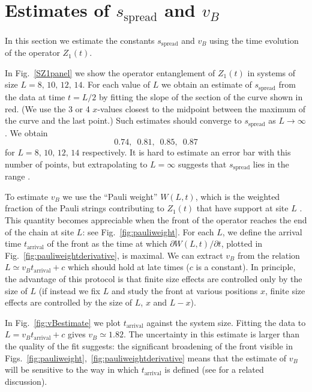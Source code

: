 \documentclass[aps,prx,twocolumn,superscriptaddress,floatfix,nofootinbib,prx]{revtex4}
\renewcommand{\>}{\right\rangle}
\newcommand{\<}{\left\langle}
\newcommand{\be}{\begin{equation}}
\newcommand{\ee}{\end{equation}}
\newcommand{\sspr}{s_\text{spread}}
\begin{document}
\section{Estimates of $\sspr$ and $v_B$}
\label{app:extrapolationsspr}



In this section we estimate the constants $\sspr$ and $v_B$ using the time evolution of the operator $Z_1(t)$. 

In Fig.~\ref{SZ1panel} we show the operator entanglement of $Z_1(t)$ in systems of size $L=8,\, 10, \, 12,\,14$. For each value of $L$ we obtain an estimate of $\sspr$ from the data at time $t=L/2$ by fitting the slope of the section of the curve shown in red. (We use the 3 or 4 $x$-values closest to the midpoint between the maximum of the curve and the last point.) Such estimates should converge to $\sspr$ as $L\rightarrow \infty$. We obtain
\be
0.74, \,\,\, 0.81, \,\,\, 0.85, \,\,\, 0.87 
\ee
for $L=8,\,10,\,12,\,14$ respectively. It is hard to estimate an error bar with this number of points, but extrapolating to ${L=\infty}$ suggests that $\sspr$ lies in the range .


To estimate $v_B$ we use the ``Pauli weight'' $W(L,t)$, which is the weighted fraction of the Pauli strings contributing to $Z_1(t)$ that have support at site $L$ \cite{rss}. This quantity becomes appreciable when the front of the operator reaches the end of the chain at site $L$: see Fig.~\ref{fig:pauliweight}.
For each $L$, we define the arrival time $t_\text{arrival}$ of the front as the time at which $\partial W(L,t)/\partial t$, plotted in Fig.~\ref{fig:pauliweightderivative},  is maximal. We can extract $v_B$ from the relation  ${L \simeq v_B t_\text{arrival} + c}$ which should hold at late times ($c$ is a constant). In principle, the advantage of this protocol is that finite size effects are controlled only by the size of $L$ (if instead we fix $L$ and study the front at various positions $x$, finite size effects are controlled by the size of $L$, $x$ and $L-x$).

In Fig.~\ref{fig:vBestimate} we plot $t_\text{arrival}$ against the system size.  Fitting the data to ${L = v_B t_\text{arrival} + c}$ gives $v_B\simeq 1.82$. 
The uncertainty in this estimate is larger than the quality of the fit suggests: the significant broadening of the front visible in Figs.~\ref{fig:pauliweight},~\ref{fig:pauliweightderivative} means that the estimate of $v_B$ will be sensitive to the way in which $t_\text{arrival}$ is defined (see \cite{ms} for a related discussion).
\end{document}
